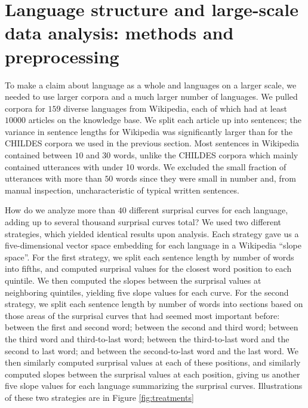 \documentclass[man,floatsintext]{apa6}
\begin{document}
\hypertarget{language-structure-and-large-scale-data-analysis-methods-and-preprocessing}{%
\section{Language structure and large-scale data analysis: methods and preprocessing}\label{language-structure-and-large-scale-data-analysis-methods-and-preprocessing}}

To make a claim about language as a whole and languages on a larger scale, we needed to use larger corpora and a much larger number of languages. We pulled corpora for \(159\) diverse languages from Wikipedia, each of which had at least \(10000\) articles on the knowledge base. We split each article up into sentences; the variance in sentence lengths for Wikipedia was significantly larger than for the CHILDES corpora we used in the previous section. Most sentences in Wikipedia contained between \(10\) and \(30\) words, unlike the CHILDES corpora which mainly contained utterances with under 10 words. We excluded the small fraction of utterances with more than \(50\) words since they were small in number and, from manual inspection, uncharacteristic of typical written sentences.

How do we analyze more than \(40\) different surprisal curves for each language, adding up to several thousand surprisal curves total? We used two different strategies, which yielded identical results upon analysis. Each strategy gave us a five-dimensional vector space embedding for each language in a Wikipedia \enquote{slope space}. For the first strategy, we split each sentence length by number of words into fifths, and computed surprisal values for the closest word position to each quintile. We then computed the slopes between the surprisal values at neighboring quintiles, yielding five slope values for each curve. For the second strategy, we split each sentence length by number of words into sections based on those areas of the surprisal curves that had seemed most important before: between the first and second word; between the second and third word; between the third word and third-to-last word; between the third-to-last word and the second to last word; and between the second-to-last word and the last word. We then similarly computed surprisal values at each of these positions, and similarly computed slopes between the surprisal values at each position, giving us another five slope values for each language summarizing the surprisal curves. Illustrations of these two strategies are in Figure \ref{fig:treatments}
\end{document}
